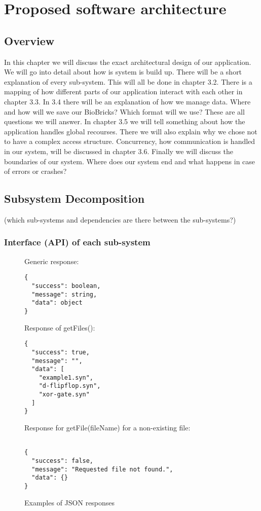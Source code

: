 \documentclass[a4paper]{article}
\begin{document}
\section{Proposed software architecture}
\subsection{Overview}
In this chapter we will discuss the exact architectural design of our application. We will go into detail about how is system is build up. There will be a short explanation of every sub-system. This will all be done in chapter 3.2. There is a mapping of how different parts of our application interact with each other in chapter 3.3. In 3.4 there will be an explanation of how we manage data. Where and how will we save our BioBricks? Which format will we use? These are all questions we will answer. In chapter 3.5 we will tell something about how the application handles global recourses. There we will also explain why we chose not to have a complex access structure. Concurrency, how communication is handled in our system, will be discussed in chapter 3.6. Finally we will discuss the boundaries of our system. Where does our system end and what happens in case of errors or crashes? 
\subsection{Subsystem Decomposition}
(which sub-systems and dependencies are there between the sub-systems?)

\subsubsection{Interface (API) of each sub-system}
\begin{figure}[h!]
\caption{Examples of JSON responses}
Generic response:
\begin{verbatim}
{
  "success": boolean,
  "message": string,
  "data": object
}
\end{verbatim}
Response of getFiles(): \begin{verbatim}
{
  "success": true,
  "message": "",
  "data": [
    "example1.syn",
    "d-flipflop.syn",
    "xor-gate.syn"
  ]
}
\end{verbatim}
Response for getFile(fileName) for a non-existing file:
\begin{verbatim}

{
  "success": false,
  "message": "Requested file not found.",
  "data": {}
}
\end{verbatim}
\end{figure}
\end{document}
